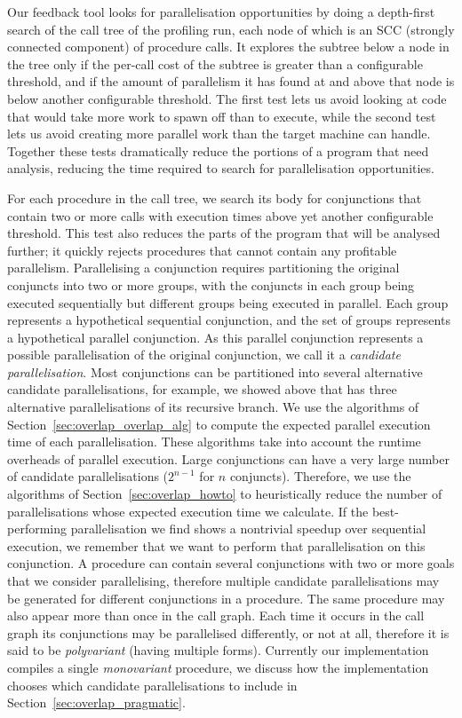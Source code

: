 Our feedback tool looks for parallelisation opportunities
by doing a depth-first search of the call tree of the profiling run,
each node of which is an SCC (strongly connected component) of procedure
calls.
It explores the subtree below a node in the tree
only if the per-call cost of the subtree is greater than a configurable
threshold,
and if the amount of parallelism it has found at and above that node
is below another configurable threshold.
The first test lets us avoid looking at code
that would take more work to spawn off than to execute,
while the second test lets us avoid creating
more parallel work than the target machine can handle.
Together these tests dramatically reduce the portions of a program that need
analysis,
reducing the time required to search for parallelisation opportunities.

For each procedure in the call tree,
we search its body for conjunctions that contain two or more calls with
execution times above yet another configurable threshold.
This test also reduces the parts of the program that will be analysed
further;
it quickly rejects procedures that cannot contain any profitable
parallelism.
Parallelising a conjunction
requires partitioning the original conjuncts into two or more groups,
with the conjuncts in each group being executed sequentially
but different groups being executed in parallel.
Each group represents a hypothetical sequential conjunction,
and the set of groups represents a hypothetical parallel conjunction.
As this parallel conjunction represents a possible parallelisation of the
original conjunction, we call it a \emph{candidate parallelisation}.
Most conjunctions can be partitioned into several alternative candidate
parallelisations,
for example, we showed above that \mapfoldl has three alternative
parallelisations of its recursive branch.
We use the algorithms of Section~\ref{sec:overlap_overlap_alg}
to compute the expected parallel execution time of each parallelisation.
These algorithms take into account the runtime overheads of parallel execution.
Large conjunctions can have a very large number of
candidate parallelisations ($2^{n-1}$ for $n$ conjuncts).
Therefore,
we use the algorithms of Section~\ref{sec:overlap_howto}
to heuristically reduce the number of parallelisations whose expected
execution time we calculate.
If the best-performing parallelisation we find
shows a nontrivial speedup over sequential execution,
we remember that we want to perform that parallelisation on this conjunction.
A procedure can contain several conjunctions with two or more goals that we
consider parallelising,
therefore multiple candidate parallelisations may be generated for different
conjunctions in a procedure.
The same procedure may also appear more than once in the call graph.
Each time it occurs in the call graph its conjunctions may be parallelised
differently, or not at all,
therefore it is said to be \emph{polyvariant} (having multiple forms).
Currently our implementation compiles a single \emph{monovariant} procedure,
we discuss how the implementation chooses which candidate parallelisations to
include in Section~\ref{sec:overlap_pragmatic}.

